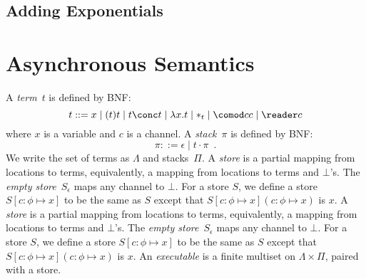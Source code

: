 \subsection{Adding Exponentials}

\section{Asynchronous Semantics}
\label{sec:async}

A \textit{term}~$t$ is defined by BNF:
\[
 t::= x
 \mid (t)t
 \mid t\conc t
 \mid \lambda x.t
 \mid \ast_t
 \mid \comod c c
 \mid \reader  c
\]
where $x$ is a variable and $c$ is a channel.
A \textit{stack}~$\pi$ is defined by BNF:
\[
 \pi ::= \epsilon
 \mid t\cdot \pi
 \enspace.
\]
We write the set of terms as $\Lambda$ and stacks~$\Pi$.
A \textit{store} is a partial mapping from locations to
terms, equivalently, a mapping from locations to terms and $\bot$'s.
The \textit{empty store}~$S_\epsilon$ maps any channel to $\bot$.
For a store $S$, we define a store $S[c\colon\phi\mapsto x]$ to be
the same as $S$ except that $S[c\colon\phi\mapsto x](c\colon\phi\mapsto
x)$ is $x$.
A \textit{store} is a partial mapping from locations to
terms, equivalently, a mapping from locations to terms and $\bot$'s.
The \textit{empty store}~$S_\epsilon$ maps any channel to $\bot$.
For a store $S$, we define a store $S[c\colon\phi\mapsto x]$ to be
the same as $S$ except that $S[c\colon\phi\mapsto x](c\colon\phi\mapsto
x)$ is $x$.
An \textit{executable} is a finite multiset on $\Lambda \times \Pi$,
paired with a store.

